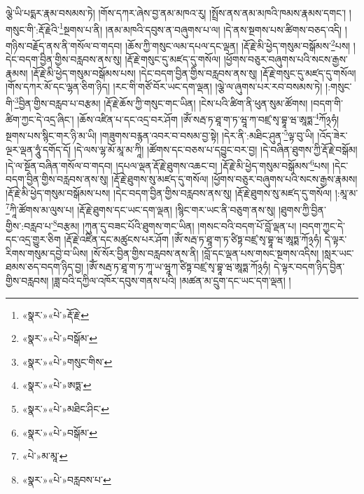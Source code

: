 ལྕེ་ཡི་པདྨར་རྣམ་བསམས་ཏེ། །གོས་དཀར་ཞེས་བྱ་ནམ་མཁའ་རུ། །སྤྲོས་ནས་ནམ་མཁའི་ཁམས་རྣམས་དགང་། །གསུང་གི་:རྡོ་རྗེའི་\footnote{«སྣར་»«པེ་»རྡོ་རྗེ་}སྔགས་པ་ནི། །ནམ་མཁའི་དབུས་ན་བཞུགས་པ་ལ། །དེ་ནས་སྔགས་པས་ཚིགས་བཅད་འདི། །གཉིས་བརྗོད་ནས་ནི་གསོལ་བ་གདབ། །ཆོས་ཀྱི་གསུང་ལམ་དཔལ་དང་ལྡན། །རྡོ་རྗེ་མི་ཕྱེད་གསུམ་བསྒོམས་\footnote{«སྣར་»«པེ་»བསྒོམ་}པས། །དེང་བདག་བྱིན་གྱིས་བརླབས་ནས་སུ། །རྡོ་རྗེ་གསུང་དུ་མཛད་དུ་གསོལ། །ཕྱོགས་བཅུར་བཞུགས་པའི་སངས་རྒྱས་རྣམས། །རྡོ་རྗེ་མི་ཕྱེད་གསུམ་བསྒོམས་པས། །དེང་བདག་བྱིན་གྱིས་བརླབས་ནས་སུ། །རྡོ་རྗེ་གསུང་དུ་མཛད་དུ་གསོལ། །གོས་དཀར་མོ་དང་ལྷན་ཅིག་ཉིད། །རང་གི་གཙོ་བོར་ཡང་དག་ལྡན། །ལྕེ་ལ་ཞུགས་པར་རབ་བསམས་ཏེ། །:གསུང་གི་\footnote{«སྣར་»«པེ་»གསུང་གིས་}བྱིན་གྱིས་བརླབ་པ་བརྩམ། །རྡོ་རྗེ་ཆོས་ཀྱི་གསུང་གང་ཡིན། །ངེས་པའི་ཚིག་ནི་ཕུན་སུམ་ཚོགས། །བདག་གི་ཚིག་ཀྱང་དེ་འདྲ་ཞིང་། །ཆོས་འཛིན་པ་དང་འདྲ་བར་ཤོག །ཨོཾ་སརྦ་ཏ་ཐཱ་ག་ཏ་ཝཱ་ཀ་བཛྲ་སྭ་བྷཱ་ཝ་ཨཱཏྨ་\footnote{«སྣར་»«པེ་»ཨཏྨ་}ཀོ྅ཧཾ། སྔགས་པས་སྙིང་གར་ཉི་མ་ཡི། །གཟུགས་བརྙན་འབར་བ་བསམ་བྱ་སྟེ། །དེར་ནི་:མཐིང་ཤུན་\footnote{«སྣར་»«པེ་»མཐིང་ཤིང་}ལྟ་བུ་ཡི། །འོད་ཟེར་ལྔར་ལྡན་ཧཱུཾ་དགོད་དོ། །དེ་ལས་ལྷ་མོ་མཱ་མ་ཀཱི། །ཚོགས་དང་བཅས་པ་དབྱུང་བར་བྱ། །དེ་བཞིན་ཐུགས་ཀྱི་རྡོ་རྗེ་བསྒོམ། །དེ་ལ་སྔོན་བཞིན་གསོལ་བ་གདབ། །དཔལ་ལྡན་རྡོ་རྗེ་ཐུགས་འཆང་བ། །རྡོ་རྗེ་མི་ཕྱེད་གསུམ་བསྒོམས་\footnote{«སྣར་»«པེ་»བསྒོམ་}པས། །དེང་བདག་བྱིན་གྱིས་བརླབས་ནས་སུ། །རྡོ་རྗེ་ཐུགས་སུ་མཛད་དུ་གསོལ། །ཕྱོགས་བཅུར་བཞུགས་པའི་སངས་རྒྱས་རྣམས། །རྡོ་རྗེ་མི་ཕྱེད་གསུམ་བསྒོམས་པས། །དེང་བདག་བྱིན་གྱིས་བརླབས་ནས་སུ། །རྡོ་རྗེ་ཐུགས་སུ་མཛད་དུ་གསོལ། །:མཱ་མ་\footnote{«པེ་»མ་མཱ་}ཀཱི་ཚོགས་མ་ལུས་པ། །རྡོ་རྗེ་ཐུགས་དང་ཡང་དག་ལྡན། །སྙིང་གར་ཡང་ནི་བཅུག་ནས་སུ། །ཐུགས་ཀྱི་བྱིན་གྱིས་:བརླབ་པ་\footnote{«སྣར་»«པེ་»བརླབས་པ་}བརྩམ། །ཀུན་དུ་བཟང་པོའི་ཐུགས་གང་ཡིན། །གསང་བའི་བདག་པོ་བློ་ལྡན་པ། །བདག་ཀྱང་དེ་དང་འདྲ་གྱུར་ཅིག །རྡོ་རྗེ་འཛིན་དང་མཚུངས་པར་ཤོག །ཨོཾ་སརྦ་ཏ་ཐཱ་ག་ཏ་ཙིཏྟ་བཛྲ་སྭ་བྷཱ་ཝ་ཨཱཏྨ་ཀོ྅ཧཾ། དེ་ལྟར་རིགས་གསུམ་དབྱེ་བ་ཡིས། །སོ་སོར་བྱིན་གྱིས་བརླབས་ནས་ནི། །བློ་དང་ལྡན་པས་གསང་སྔགས་འདིས། །སླར་ཡང་ཐམས་ཅད་བདག་ཉིད་བྱ། །ཨོཾ་སརྦ་ཏ་ཐཱ་ག་ཏ་ཀཱ་ཡ་ཝཱཀ་ཙིཏྟ་བཛྲ་སྭ་བྷཱ་ཝ་ཨཱཏྨ་ཀོ྅ཧཾ། དེ་ལྟར་བདག་ཉིད་བྱིན་གྱིས་བརླབས། །ཟླ་བའི་དཀྱིལ་འཁོར་དབུས་གནས་པའི། །མཚན་མ་དྲུག་དང་ཡང་དག་ལྡན། །

